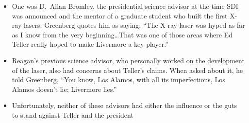 \documentclass[12pt]{article}
\begin{document}
\begin{description}
\begin{description}
\begin{itemize}
          \item One was D.\ Allan Bromley, the presidential science advisor at
            the time SDI was announced and the mentor of a graduate student who
            built the first X-ray lasers. Greenberg quotes him as saying, ``The
            X-ray laser was hyped as far as I know from the very
            beginning\ldots That was one of those areas where Ed Teller really
            hoped to make Livermore a key player.''

          \item Reagan's previous science advisor, who personally worked on the
            development of the laser, also had concerns about Teller's claims.
            When asked about it, he told Greenberg, ``You know, Los Alamos,
            with all its imperfections, Los Alamos doesn't lie; Livermore
            lies.''

          \item Unfortunately, neither of these advisors had either the
            influence or the guts to stand against Teller and the president

        \end{itemize}
        



\end{description}
\end{description}
\end{document}
